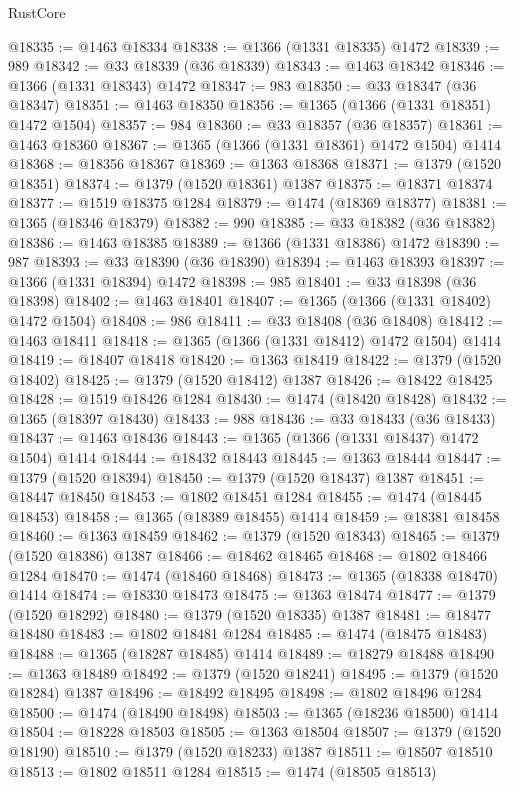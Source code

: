 \begin{lexlean}{RustCore}
\begin{coremodule}
@18335 := @1463 @18334
@18338 := @1366 (@1331 @18335) @1472
@18339 := 989
@18342 := @33 @18339 (@36 @18339)
@18343 := @1463 @18342
@18346 := @1366 (@1331 @18343) @1472
@18347 := 983
@18350 := @33 @18347 (@36 @18347)
@18351 := @1463 @18350
@18356 := @1365 (@1366 (@1331 @18351) @1472 @1504)
@18357 := 984
@18360 := @33 @18357 (@36 @18357)
@18361 := @1463 @18360
@18367 := @1365 (@1366 (@1331 @18361) @1472 @1504) @1414
@18368 := @18356 @18367
@18369 := @1363 @18368
@18371 := @1379 (@1520 @18351)
@18374 := @1379 (@1520 @18361) @1387
@18375 := @18371 @18374
@18377 := @1519 @18375 @1284
@18379 := @1474 (@18369 @18377)
@18381 := @1365 (@18346 @18379)
@18382 := 990
@18385 := @33 @18382 (@36 @18382)
@18386 := @1463 @18385
@18389 := @1366 (@1331 @18386) @1472
@18390 := 987
@18393 := @33 @18390 (@36 @18390)
@18394 := @1463 @18393
@18397 := @1366 (@1331 @18394) @1472
@18398 := 985
@18401 := @33 @18398 (@36 @18398)
@18402 := @1463 @18401
@18407 := @1365 (@1366 (@1331 @18402) @1472 @1504)
@18408 := 986
@18411 := @33 @18408 (@36 @18408)
@18412 := @1463 @18411
@18418 := @1365 (@1366 (@1331 @18412) @1472 @1504) @1414
@18419 := @18407 @18418
@18420 := @1363 @18419
@18422 := @1379 (@1520 @18402)
@18425 := @1379 (@1520 @18412) @1387
@18426 := @18422 @18425
@18428 := @1519 @18426 @1284
@18430 := @1474 (@18420 @18428)
@18432 := @1365 (@18397 @18430)
@18433 := 988
@18436 := @33 @18433 (@36 @18433)
@18437 := @1463 @18436
@18443 := @1365 (@1366 (@1331 @18437) @1472 @1504) @1414
@18444 := @18432 @18443
@18445 := @1363 @18444
@18447 := @1379 (@1520 @18394)
@18450 := @1379 (@1520 @18437) @1387
@18451 := @18447 @18450
@18453 := @1802 @18451 @1284
@18455 := @1474 (@18445 @18453)
@18458 := @1365 (@18389 @18455) @1414
@18459 := @18381 @18458
@18460 := @1363 @18459
@18462 := @1379 (@1520 @18343)
@18465 := @1379 (@1520 @18386) @1387
@18466 := @18462 @18465
@18468 := @1802 @18466 @1284
@18470 := @1474 (@18460 @18468)
@18473 := @1365 (@18338 @18470) @1414
@18474 := @18330 @18473
@18475 := @1363 @18474
@18477 := @1379 (@1520 @18292)
@18480 := @1379 (@1520 @18335) @1387
@18481 := @18477 @18480
@18483 := @1802 @18481 @1284
@18485 := @1474 (@18475 @18483)
@18488 := @1365 (@18287 @18485) @1414
@18489 := @18279 @18488
@18490 := @1363 @18489
@18492 := @1379 (@1520 @18241)
@18495 := @1379 (@1520 @18284) @1387
@18496 := @18492 @18495
@18498 := @1802 @18496 @1284
@18500 := @1474 (@18490 @18498)
@18503 := @1365 (@18236 @18500) @1414
@18504 := @18228 @18503
@18505 := @1363 @18504
@18507 := @1379 (@1520 @18190)
@18510 := @1379 (@1520 @18233) @1387
@18511 := @18507 @18510
@18513 := @1802 @18511 @1284
@18515 := @1474 (@18505 @18513)

\end{coremodule}
\end{lexlean}
